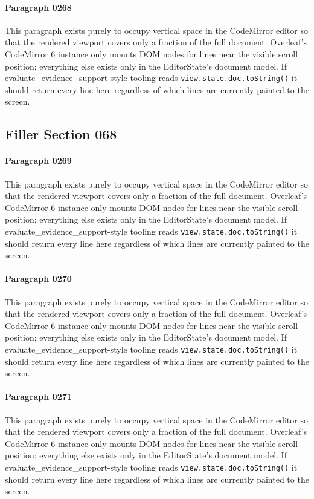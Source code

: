 \documentclass{article}
\begin{document}
\paragraph{Paragraph 0268}
This paragraph exists purely to occupy vertical space in the CodeMirror editor so that the rendered viewport covers only a fraction of the full document. Overleaf's CodeMirror 6 instance only mounts DOM nodes for lines near the visible scroll position; everything else exists only in the EditorState's document model. If evaluate\_evidence\_support-style tooling reads \texttt{view.state.doc.toString()} it should return every line here regardless of which lines are currently painted to the screen.

\subsection{Filler Section 068}
\paragraph{Paragraph 0269}
This paragraph exists purely to occupy vertical space in the CodeMirror editor so that the rendered viewport covers only a fraction of the full document. Overleaf's CodeMirror 6 instance only mounts DOM nodes for lines near the visible scroll position; everything else exists only in the EditorState's document model. If evaluate\_evidence\_support-style tooling reads \texttt{view.state.doc.toString()} it should return every line here regardless of which lines are currently painted to the screen.

\paragraph{Paragraph 0270}
This paragraph exists purely to occupy vertical space in the CodeMirror editor so that the rendered viewport covers only a fraction of the full document. Overleaf's CodeMirror 6 instance only mounts DOM nodes for lines near the visible scroll position; everything else exists only in the EditorState's document model. If evaluate\_evidence\_support-style tooling reads \texttt{view.state.doc.toString()} it should return every line here regardless of which lines are currently painted to the screen.

\paragraph{Paragraph 0271}
This paragraph exists purely to occupy vertical space in the CodeMirror editor so that the rendered viewport covers only a fraction of the full document. Overleaf's CodeMirror 6 instance only mounts DOM nodes for lines near the visible scroll position; everything else exists only in the EditorState's document model. If evaluate\_evidence\_support-style tooling reads \texttt{view.state.doc.toString()} it should return every line here regardless of which lines are currently painted to the screen.
\end{document}
